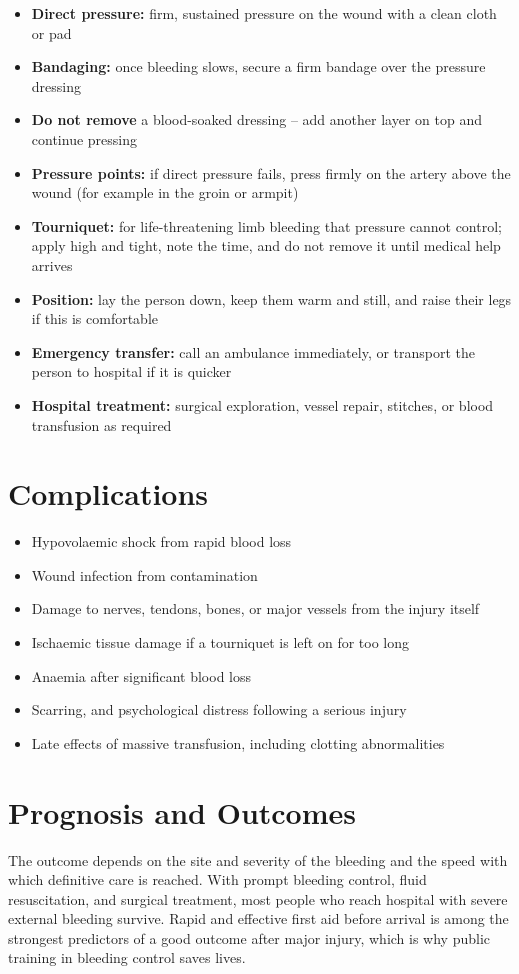 \begin{itemize}
    \item \textbf{Direct pressure:} firm, sustained pressure on the wound with a clean cloth or pad
    \item \textbf{Bandaging:} once bleeding slows, secure a firm bandage over the pressure dressing
    \item \textbf{Do not remove} a blood-soaked dressing -- add another layer on top and continue pressing
    \item \textbf{Pressure points:} if direct pressure fails, press firmly on the artery above the wound (for example in the groin or armpit)
    \item \textbf{Tourniquet:} for life-threatening limb bleeding that pressure cannot control; apply high and tight, note the time, and do not remove it until medical help arrives
    \item \textbf{Position:} lay the person down, keep them warm and still, and raise their legs if this is comfortable
    \item \textbf{Emergency transfer:} call an ambulance immediately, or transport the person to hospital if it is quicker
    \item \textbf{Hospital treatment:} surgical exploration, vessel repair, stitches, or blood transfusion as required
\end{itemize}

\section*{Complications}
\begin{itemize}
    \item Hypovolaemic shock from rapid blood loss
    \item Wound infection from contamination
    \item Damage to nerves, tendons, bones, or major vessels from the injury itself
    \item Ischaemic tissue damage if a tourniquet is left on for too long
    \item Anaemia after significant blood loss
    \item Scarring, and psychological distress following a serious injury
    \item Late effects of massive transfusion, including clotting abnormalities
\end{itemize}

\section*{Prognosis and Outcomes}
The outcome depends on the site and severity of the bleeding and the speed with which definitive care is reached. With prompt bleeding control, fluid resuscitation, and surgical treatment, most people who reach hospital with severe external bleeding survive. Rapid and effective first aid before arrival is among the strongest predictors of a good outcome after major injury, which is why public training in bleeding control saves lives.

